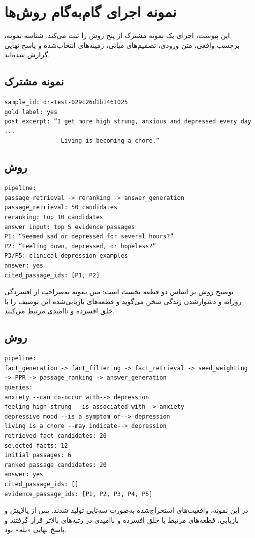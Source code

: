 \chapter{نمونه اجرای گام‌به‌گام روش‌ها}\label{app:step-by-step}

این پیوست، اجرای یک نمونه مشترک از پنج روش را ثبت می‌کند. شناسه نمونه، برچسب واقعی، متن ورودی، تصمیم‌های میانی، زمینه‌های انتخاب‌شده و پاسخ نهایی گزارش شده‌اند.

\section{نمونه مشترک}
\begin{latin}\footnotesize\begin{verbatim}
sample_id: dr-test-029c26d1b1461025
gold label: yes
post excerpt: “I get more high strung, anxious and depressed every day ...
                Living is becoming a chore.”
\end{verbatim}
\end{latin}

\section{روش }
\begin{latin}\footnotesize\begin{verbatim}
pipeline:
passage_retrieval -> reranking -> answer_generation
passage_retrieval: 50 candidates
reranking: top 10 candidates
answer input: top 5 evidence passages
P1: “Seemed sad or depressed for several hours?”
P2: “Feeling down, depressed, or hopeless?”
P3/P5: clinical depression examples
answer: yes
cited_passage_ids: [P1, P2]
\end{verbatim}
\end{latin}
توضیح روش بر اساس دو قطعه نخست است: متن نمونه به‌صراحت از افسردگی روزانه و دشوارشدن زندگی سخن می‌گوید و قطعه‌های بازیابی‌شده این توصیف را با خلق افسرده و ناامیدی مرتبط می‌کنند.

\section{روش }
\begin{latin}\footnotesize\begin{verbatim}
pipeline:
fact_generation -> fact_filtering -> fact_retrieval -> seed_weighting
-> PPR -> passage_ranking -> answer_generation
queries:
anxiety --can co-occur with--> depression
feeling high strung --is associated with--> anxiety
depressive mood --is a symptom of--> depression
living is a chore --may indicate--> depression
retrieved fact candidates: 20
selected facts: 12
initial passages: 6
ranked passage candidates: 20
answer: yes
cited_passage_ids: []
evidence_passage_ids: [P1, P2, P3, P4, P5]
\end{verbatim}
\end{latin}
در این نمونه، واقعیت‌های استخراج‌شده به‌صورت سه‌تایی تولید شدند. پس از پالایش و بازیابی، قطعه‌های مرتبط با خلق افسرده و ناامیدی در رتبه‌های بالاتر قرار گرفتند و پاسخ نهایی «بله» بود.

